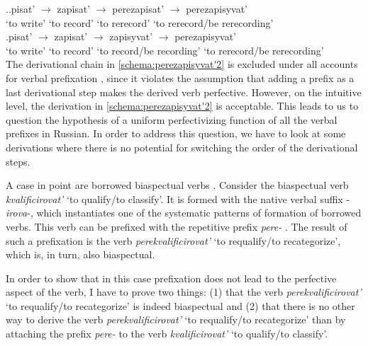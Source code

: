 \ex.\label{schema:perezapisyvat'}\ag.\label{schema:perezapisyvat'1}pisat'\textsuperscript{\IPF} {$\rightarrow$} zapisat'\textsuperscript{\PF} {$\rightarrow$} perezapisat'\textsuperscript{\PF} {$\rightarrow$} perezapisyvat'\textsuperscript{\IPF} \\
{`to write'} {} {`to record'} {} {`to rerecord'} {} {`to rerecord/be rerecording'}\\
\bg.\label{schema:perezapisyvat'2}pisat'\textsuperscript{\IPF} {$\rightarrow$} zapisat'\textsuperscript{\PF} {$\rightarrow$} zapisyvat'\textsuperscript{\IPF} {$\rightarrow$} perezapisyvat'\textsuperscript{\IPF} \\
{`to write'} {} {`to record'} {} {`to record/be recording'} {} {`to rerecord/be rerecording'}\\

The derivational chain in \ref{schema:perezapisyvat'2} is excluded under all accounts for verbal prefixation , since it violates the assumption that adding a prefix as a last derivational step makes the derived verb perfective. However, on the intuitive level, the derivation in \ref{schema:perezapisyvat'2} is acceptable. This leads to us to question the hypothesis of a uniform perfectivizing function of all the verbal prefixes in Russian. In order to address this question, we have to look at some derivations where there is no potential for switching the order of the derivational steps.

A case in point are borrowed biaspectual verbs   . Consider the biaspectual verb  \textit{kvalificirovat'} `to qualify/to classify'. It is formed with the native verbal suffix -\textit{irova}-, which instantiates one of the systematic patterns of formation of borrowed verbs. This verb can be prefixed with the repetitive  prefix \textit{pere-}  . The result of such a prefixation  is the verb \textit{perekvalificirovat'} `to requalify/to recategorize', which is, in turn, also biaspectual.

In order to show that in this case prefixation  does not lead to the perfective aspect of the verb, I have to prove two things: (1) that the verb \textit{perekvalificirovat'} `to requalify/to recategorize' is indeed biaspectual and (2) that there is no other way to derive the verb \textit{perekvalificirovat'} `to requalify/to recategorize' than by attaching the prefix \textit{pere-}   to the verb \textit{kvalificirovat'} `to qualify/to classify'.

